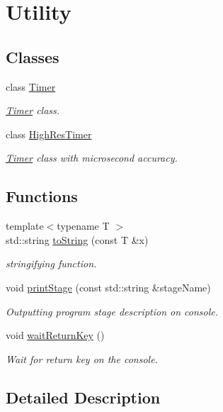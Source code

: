 \hypertarget{group___utility}{\section{Utility}
\label{group___utility}
}
\subsection*{Classes}
\begin{DoxyCompactItemize}
\item 
class \hyperlink{class_d_o_1_1_timer}{Timer}
\begin{DoxyCompactList}\small\item\em \hyperlink{class_d_o_1_1_timer}{Timer} class. \end{DoxyCompactList}\item 
class \hyperlink{class_d_o_1_1_high_res_timer}{High\-Res\-Timer}
\begin{DoxyCompactList}\small\item\em \hyperlink{class_d_o_1_1_timer}{Timer} class with microsecond accuracy. \end{DoxyCompactList}\end{DoxyCompactItemize}
\subsection*{Functions}
\begin{DoxyCompactItemize}
\item 
\hypertarget{group___utility_ga822e83b6eef265d4189aca150f0821db}{{\footnotesize template$<$typename T $>$ }\\std\-::string \hyperlink{group___utility_ga822e83b6eef265d4189aca150f0821db}{to\-String} (const T \&x)}\label{group___utility_ga822e83b6eef265d4189aca150f0821db}

\begin{DoxyCompactList}\small\item\em stringifying function. \end{DoxyCompactList}\item 
\hypertarget{group___utility_gaec63207d40454271e3d0e42802dbb73e}{void \hyperlink{group___utility_gaec63207d40454271e3d0e42802dbb73e}{print\-Stage} (const std\-::string \&stage\-Name)}\label{group___utility_gaec63207d40454271e3d0e42802dbb73e}

\begin{DoxyCompactList}\small\item\em Outputting program stage description on console. \end{DoxyCompactList}\item 
\hypertarget{group___utility_ga553a39cfa65861e30418250dfba7417c}{void \hyperlink{group___utility_ga553a39cfa65861e30418250dfba7417c}{wait\-Return\-Key} ()}\label{group___utility_ga553a39cfa65861e30418250dfba7417c}

\begin{DoxyCompactList}\small\item\em Wait for return key on the console. \end{DoxyCompactList}\end{DoxyCompactItemize}


\subsection{Detailed Description}
